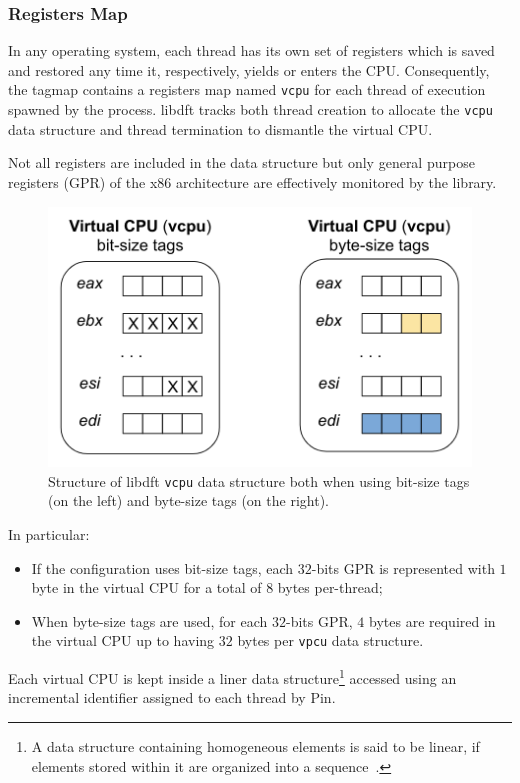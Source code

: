 \documentclass[LaM,binding=0.6cm]{sapthesis}
\begin{document}
\subsubsection{Registers Map}
In any operating system, each thread has its own set of registers which is saved and restored any time it, respectively, yields or enters the CPU. Consequently, the tagmap contains a registers map named \texttt{vcpu} for each thread of execution spawned by the process. libdft tracks both thread creation to allocate the \texttt{vcpu} data structure and thread termination to dismantle the virtual CPU.

Not all registers are included in the data structure but only general purpose registers (GPR) of the x$86$ architecture are effectively monitored by the library. \\

\begin{figure}[h!]
\centering
\includegraphics[scale=.6]{images/techn12}
\caption{Structure of libdft \texttt{vcpu} data structure both when using bit-size tags (on the left) and byte-size tags (on the right).}
\end{figure}

\noindent In particular:
\begin{itemize}
\item If the configuration uses bit-size tags, each $32$-bits GPR is represented with $1$ byte in the virtual CPU for a total of $8$ bytes per-thread;
\item When byte-size tags are used, for each $32$-bits GPR, $4$ bytes are required in the virtual CPU up to having $32$ bytes per \texttt{vpcu} data structure.
\end{itemize}
Each virtual CPU is kept inside a liner data structure\footnote{A data structure containing homogeneous elements is said to be linear, if elements stored within it are organized into a sequence~\cite{li1998linear}.} accessed using an incremental identifier assigned to each thread by Pin.
\end{document}
